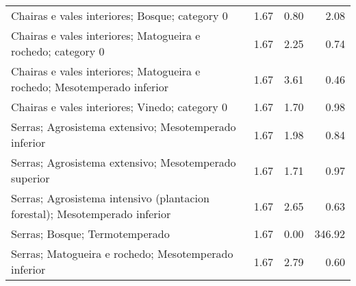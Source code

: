 \begin{table}[p]
\begin{tabular}{lrrr}
  Chairas e vales interiores; Bosque; category 0 & 1.67 & 0.80 & 2.08 \\ 
  Chairas e vales interiores; Matogueira e rochedo; category 0 & 1.67 & 2.25 & 0.74 \\ 
  Chairas e vales interiores; Matogueira e rochedo; Mesotemperado inferior & 1.67 & 3.61 & 0.46 \\ 
  Chairas e vales interiores; Vinedo; category 0 & 1.67 & 1.70 & 0.98 \\ 
  Serras; Agrosistema extensivo; Mesotemperado inferior & 1.67 & 1.98 & 0.84 \\ 
  Serras; Agrosistema extensivo; Mesotemperado superior & 1.67 & 1.71 & 0.97 \\ 
  Serras; Agrosistema intensivo (plantacion forestal); Mesotemperado inferior & 1.67 & 2.65 & 0.63 \\ 
  Serras; Bosque; Termotemperado & 1.67 & 0.00 & 346.92 \\ 
  Serras; Matogueira e rochedo; Mesotemperado inferior & 1.67 & 2.79 & 0.60 \\ 
   \hline
\end{tabular}
\end{table}
